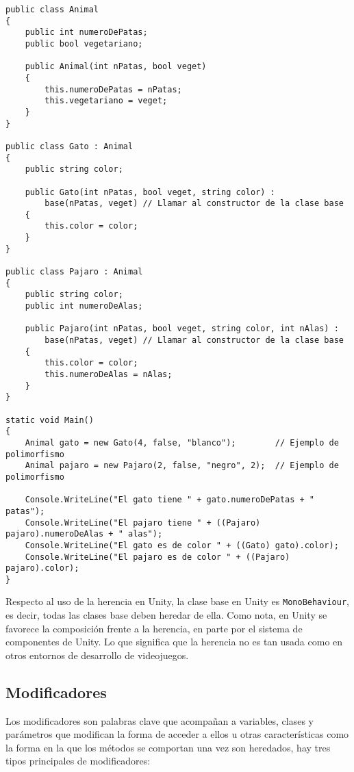 \documentclass{pre-tfg}
\begin{document}
\begin{spacing}{1}
\begin{lstlisting}[float=htbp, caption={Ejemplo de clase con campos, sobrecarga de métodos y constructor}, label=lst:hierarchy]
public class Animal
{ 
	public int numeroDePatas;
	public bool vegetariano;
	
	public Animal(int nPatas, bool veget)
	{
		this.numeroDePatas = nPatas;
		this.vegetariano = veget;
	}	
}

public class Gato : Animal
{
	public string color;
	
	public Gato(int nPatas, bool veget, string color) :
		base(nPatas, veget) // Llamar al constructor de la clase base
	{		
		this.color = color;
	}	
}

public class Pajaro : Animal
{
	public string color;
	public int numeroDeAlas;
	
	public Pajaro(int nPatas, bool veget, string color, int nAlas) :
		base(nPatas, veget) // Llamar al constructor de la clase base
	{		
		this.color = color;
		this.numeroDeAlas = nAlas;
	}	
}

static void Main()
{
	Animal gato = new Gato(4, false, "blanco");        // Ejemplo de polimorfismo
	Animal pajaro = new Pajaro(2, false, "negro", 2);  // Ejemplo de polimorfismo
		
	Console.WriteLine("El gato tiene " + gato.numeroDePatas + " patas");
	Console.WriteLine("El pajaro tiene " + ((Pajaro) pajaro).numeroDeAlas + " alas");
	Console.WriteLine("El gato es de color " + ((Gato) gato).color);
	Console.WriteLine("El pajaro es de color " + ((Pajaro) pajaro).color);
}
\end{lstlisting}
\end{spacing}

Respecto al uso de la herencia en Unity, la clase base en Unity es \texttt{MonoBehaviour}, es decir, todas las clases base deben heredar de ella. Como nota, en Unity se favorece la composición frente a la herencia, en parte por el sistema de componentes de Unity. Lo que significa que la herencia no es tan usada como en otros entornos de desarrollo de videojuegos.

\subsection{Modificadores}

Los modificadores son palabras clave que acompañan a variables, clases y parámetros que modifican la forma de acceder a ellos u otras características como la forma en la que los métodos se comportan una vez son heredados, hay tres tipos principales de modificadores:
\end{document}
